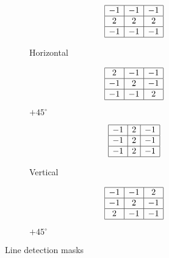 \begin{figure}[h]
	\centering
	\begin{subfigure}[b]{0.2\textwidth}
		\centering
		\[
		\begin{array}{|c|c|c|}
			\hline
			-1 & -1 & -1\\
			\hline
			2 & 2 & 2\\
			\hline
			-1 & -1 & -1\\
			\hline
		\end{array}
		\]
		\caption{Horizontal}
	\end{subfigure}
	\begin{subfigure}[b]{0.2\textwidth}
		\centering
		\[
		\begin{array}{|c|c|c|}
			\hline
			2 & -1 & -1\\
			\hline
			-1 & 2 & -1\\
			\hline
			-1 & -1 & 2\\
			\hline
		\end{array}
		\]
		\caption{$+45^\circ$}
	\end{subfigure}
	\begin{subfigure}[b]{0.2\textwidth}
		\centering
		\[
		\begin{array}{|c|c|c|}
			\hline
			-1 & 2 & -1\\
			\hline
			-1 & 2 & -1\\
			\hline
			-1 & 2 & -1\\
			\hline
		\end{array}
		\]
		\caption{Vertical}
	\end{subfigure}
	\begin{subfigure}[b]{0.2\textwidth}
		\centering
		\[
		\begin{array}{|c|c|c|}
			\hline
			-1 & -1 & 2\\
			\hline
			-1 & 2 & -1\\
			\hline
			2 & -1 & -1\\
			\hline
		\end{array}
		\]
		\caption{$+45^\circ$}
	\end{subfigure}
	\caption{Line detection masks}
\end{figure}

